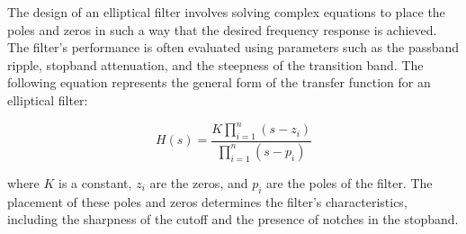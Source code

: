 The design of an elliptical filter involves solving complex equations to place the poles and zeros in such a way that the desired frequency response is achieved. The filter's performance is often evaluated using parameters such as the passband ripple, stopband attenuation, and the steepness of the transition band. The following equation represents the general form of the transfer function for an elliptical filter:

\[
H(s) = \frac{K \prod_{i=1}^{n} (s - z_i)}{\prod_{i=1}^{n} (s - p_i)}
\]

where \( K \) is a constant, \( z_i \) are the zeros, and \( p_i \) are the poles of the filter. The placement of these poles and zeros determines the filter's characteristics, including the sharpness of the cutoff and the presence of notches in the stopband.

